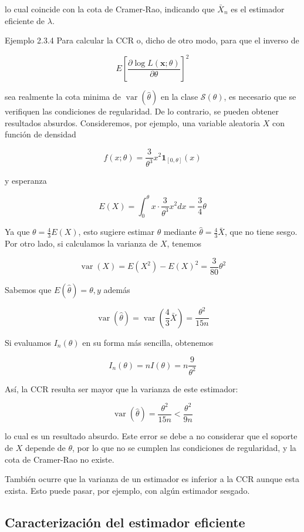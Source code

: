 \documentclass[
]{article}
\begin{document}
lo cual coincide con la cota de Cramer-Rao, indicando que \(\bar{X}_{n}\) es el estimador eficiente de \(\lambda\).

Ejemplo 2.3.4 Para calcular la CCR o, dicho de otro modo, para que el inverso de

\[
E\left[\frac{\partial \log L(\mathbf{x} ; \theta)}{\partial \theta}\right]^{2}
\]

sea realmente la cota minima de \(\operatorname{var}(\widehat{\theta})\) en la clase \(\mathcal{S}(\theta)\), es necesario que se verifiquen las condiciones de regularidad. De lo contrario, se pueden obtener resultados absurdos.
Consideremos, por ejemplo, una variable aleatoria \(X\) con función de densidad

\[
f(x ; \theta)=\frac{3}{\theta^{3}} x^{2} \mathbf{1}_{[0, \theta]}(x)
\]

y esperanza

\[
E(X)=\int_{0}^{\theta} x \cdot \frac{3}{\theta^{3}} x^{2} d x=\frac{3}{4} \theta
\]

Ya que \(\theta=\frac{4}{3} E(X)\), esto sugiere estimar \(\theta\) mediante \(\widehat{\theta}=\frac{4}{3} \bar{X}\), que no tiene sesgo.
Por otro lado, si calculamos la varianza de \(X\), tenemos

\[
\operatorname{var}(X)=E\left(X^{2}\right)-E(X)^{2}=\frac{3}{80} \theta^{2}
\]

Sabemos que \(E(\widehat{\theta})=\theta, y\) además

\[
\operatorname{var}(\widehat{\theta})=\operatorname{var}\left(\frac{4}{3} \bar{X}\right)=\frac{\theta^{2}}{15 n}
\]

Si evaluamos \(I_{n}(\theta)\) en su forma más sencilla, obtenemos

\[
I_{n}(\theta)=n I(\theta)=n \frac{9}{\theta^{2}}
\]

Así, la CCR resulta ser mayor que la varianza de este estimador:

\[
\operatorname{var}(\widehat{\theta})=\frac{\theta^{2}}{15 n}<\frac{\theta^{2}}{9 n}
\]

lo cual es un resultado absurdo. Este error se debe a no considerar que el soporte de \(X\) depende de \(\theta\), por lo que no se cumplen las condiciones de regularidad, y la cota de Cramer-Rao no existe.

También ocurre que la varianza de un estimador es inferior a la CCR aunque esta exista. Esto puede pasar, por ejemplo, con algún estimador sesgado.

\subsection{Caracterización del estimador eficiente}\label{caracterizaciuxf3n-del-estimador-eficiente}
\end{document}
